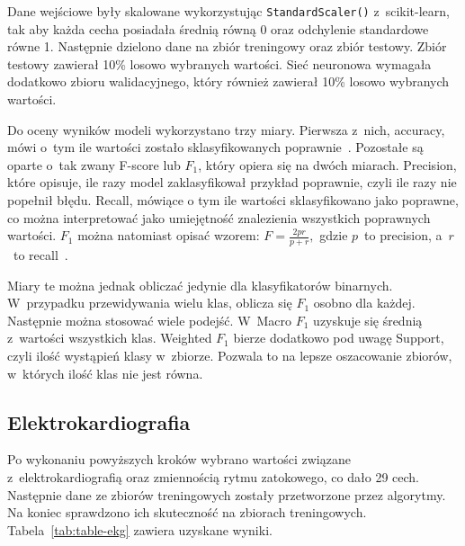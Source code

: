 Dane wejściowe były skalowane wykorzystując \texttt{StandardScaler()} z~scikit-learn, tak aby każda cecha posiadała średnią równą 0 oraz odchylenie standardowe równe 1.
Następnie dzielono dane na zbiór treningowy oraz zbiór testowy.
Zbiór testowy zawierał 10\% losowo wybranych wartości.
Sieć neuronowa wymagała dodatkowo zbioru walidacyjnego, który również zawierał 10\% losowo wybranych wartości.

Do oceny wyników modeli wykorzystano trzy miary.
Pierwsza z~nich, accuracy, mówi o~tym ile wartości zostało sklasyfikowanych poprawnie~\cite{Goodfellow2016}.
Pozostałe są oparte o~tak zwany F-score lub \(F_{1}\), który opiera się na dwóch miarach.
Precision, które opisuje, ile razy model zaklasyfikował przykład poprawnie, czyli ile razy nie popełnił błędu.
Recall, mówiące o tym ile wartości sklasyfikowano jako poprawne, co można interpretować jako umiejętność znalezienia wszystkich poprawnych wartości.
\(F_{1}\) można natomiast opisać wzorem: \(F = \frac{2pr}{p + r},\) gdzie \(p\)~to precision, a~\(r\)~to recall~\cite{Goodfellow2016}.

Miary te można jednak obliczać jedynie dla klasyfikatorów binarnych.
W~przypadku przewidywania wielu klas, oblicza się \(F_{1}\) osobno dla każdej.
Następnie można stosować wiele podejść.
W~Macro \(F_{1}\) uzyskuje się średnią z~wartości wszystkich klas.
Weighted \(F_{1}\) bierze dodatkowo pod uwagę Support, czyli ilość wystąpień klasy w~zbiorze.
Pozwala to na lepsze oszacowanie zbiorów, w~których ilość klas nie jest równa.

\subsection{Elektrokardiografia}\label{subsec:ekg}

Po wykonaniu powyższych kroków wybrano wartości związane z~elektrokardiografią oraz zmiennością rytmu zatokowego, co dało 29 cech.
Następnie dane ze zbiorów treningowych zostały przetworzone przez algorytmy.
Na koniec sprawdzono ich skuteczność na zbiorach treningowych.
Tabela~\ref{tab:table-ekg} zawiera uzyskane wyniki.

